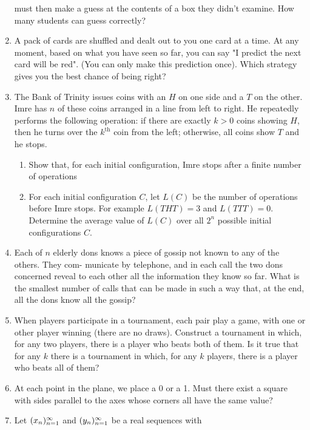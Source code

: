 \documentclass[12pt,a4paper]{article}
\begin{document}
\begin{enumerate}
       must then make a guess at the contents of a box they didn’t examine. How
       many students can guess correctly?
 \item A pack of cards are shuffled and dealt out to you one card at a time. At
       any moment, based on what you have seen so far, you can say "I predict
       the next card will be red". (You can only make this prediction once).
       Which strategy gives you the best chance of being right?
 \item The Bank of Trinity issues coins with an \(H\) on one side and a \(T\) on
       the other. Imre has \(n\) of these coins arranged in a line from left to
       right. He repeatedly performs the following operation: if there are
       exactly \(k > 0\) coins showing \(H\), then he turns over the
       \(k^{\text{th}}\) coin from the left; otherwise, all coins show \(T\) and
       he stops.
  \begin{enumerate}
   \item Show that, for each initial configuration, Imre stops after a finite
         number of operations
   \item For each initial configuration \(C\), let \(L(C)\) be the number of
         operations before Imre stops. For example \(L(\mathit{THT}) = 3\) and
         \(L(\mathit{TTT}) = 0\). Determine the average value of \(L(C)\) over
         all \(2^n\) possible initial configurations \(C\).
  \end{enumerate}
 \item Each of \(n\) elderly dons knows a piece of gossip not known to any of
       the others. They com- municate by telephone, and in each call the two
       dons concerned reveal to each other all the information they know so far.
       What is the smallest number of calls that can be made in such a way that,
       at the end, all the dons know all the gossip?
 \item When players participate in a tournament, each pair play a game, with one
       or other player winning (there are no draws). Construct a tournament in
       which, for any two players, there is a player who beats both of them. Is
       it true that for any \(k\) there is a tournament in which, for any \(k\)
       players, there is a player who beats all of them?
 \item At each point in the plane, we place a 0 or a 1. Must there exist a
       square with sides parallel to the axes whose corners all have the same
       value?
 \item Let \((x _n)_{n = 1}^{\infty}\) and \((y _n)_{n = 1}^{\infty}\) be a real sequences with

\end{enumerate}
\end{document}
